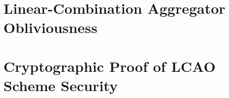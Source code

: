 
\chapter{Linear-Combination Aggregator Obliviousness}

\chapter{Cryptographic Proof of LCAO Scheme Security}